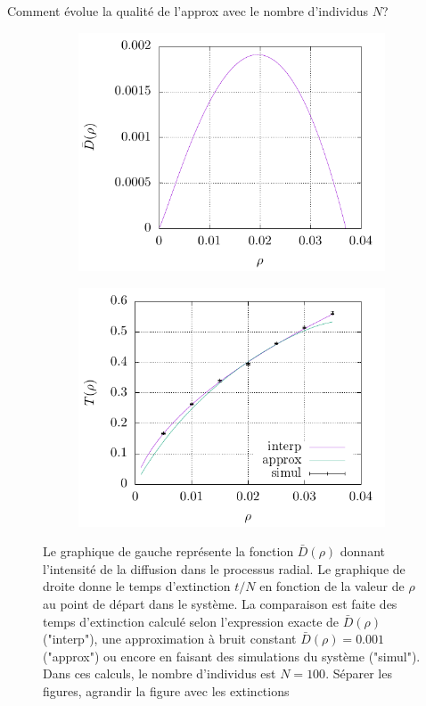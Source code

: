 \documentclass[openany,a4paper,12pt]{article}
\begin{document}
{\color{red} Comment évolue la qualité de l'approx avec le nombre d'individus $N$?}

\begin{figure}
	\centering
	\begin{subfigure}{.5\textwidth}
		\centering
		\includegraphics[width=\linewidth]{figures/D_rho}
	\end{subfigure}%
	\begin{subfigure}{.5\textwidth}
		\centering
		\includegraphics[width=\linewidth]{figures/extc_time_comparison}
	\end{subfigure}%
	\caption{Le graphique de gauche représente la fonction $\bar D(\rho)$ donnant l'intensité de la diffusion dans le processus radial. Le graphique de droite donne le temps d'extinction $t/N$ en fonction de la valeur de $\rho$ au point de départ dans le système. La comparaison est faite des temps d'extinction calculé selon l'expression exacte de $\bar D(\rho)$ ("interp"), une approximation à bruit constant $\bar D(\rho)=0.001$ ("approx") ou encore en faisant des simulations du système ("simul"). Dans ces calculs, le nombre d'individus est $N=100$. {\color{red} Séparer les figures, agrandir la figure avec les extinctions}}
	\label{fig:D_rho_et_extc}
\end{figure}
\end{document}
